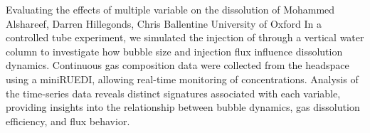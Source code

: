 \begin{conf-abstract}
{Evaluating the effects of multiple variable on the dissolution of }
{Mohammed Alshareef, Darren Hillegonds, Chris Ballentine}
{University of Oxford}
{In a controlled tube experiment, we simulated the injection of  through a vertical water column to investigate how bubble size and injection flux influence  dissolution dynamics. Continuous gas composition data were collected from the headspace using a miniRUEDI, allowing real-time monitoring of  concentrations. Analysis of the time-series data reveals distinct signatures associated with each variable, providing insights into the relationship between bubble dynamics, gas dissolution efficiency, and flux behavior.}
\end{conf-abstract}
